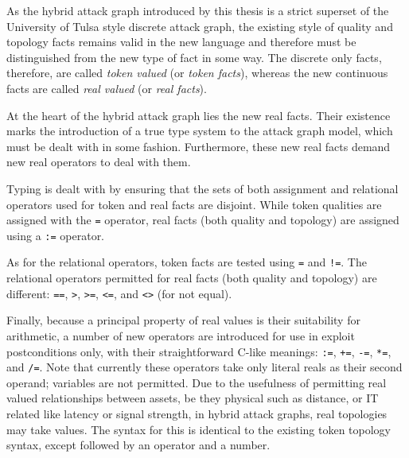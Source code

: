 As the hybrid attack graph introduced by this thesis is a strict superset
of the University of Tulsa style discrete attack graph, the existing style
of quality and topology facts remains valid in the new language and therefore
must be distinguished from the new type of fact in some way. The discrete
only facts, therefore, are called \emph{token valued} (or \emph{token facts}),
whereas the new continuous facts are called \emph{real valued} (or \emph{real
facts}).

At the heart of the hybrid attack graph lies the new real facts. Their
existence marks the introduction of a true type system to the attack graph
model, which must be dealt with in some fashion. Furthermore, these new real 
facts demand new real operators to deal with them.

Typing is dealt with by ensuring that the sets of both assignment and relational
operators used for token and real facts are disjoint. While token qualities are
assigned with the \texttt{=} operator, real facts (both quality and topology)
are assigned using a \texttt{:=} operator.

As for the relational operators, token facts are tested using \texttt{=} 
and \texttt{!=}. The relational operators permitted for real facts (both
quality and topology) are different: \texttt{==}, \texttt{>}, \texttt{>=},
\texttt{<=}, and \texttt{<>} (for not equal).

Finally, because a principal property of real values is their suitability for
arithmetic, a number of new operators are introduced for use in exploit
postconditions only, with their straightforward C-like meanings: \texttt{:=},
\texttt{+=}, \texttt{-=}, \texttt{*=}, and \texttt{/=}. Note that currently
these operators take only literal reals as their second operand; variables
are not permitted.
Due to the usefulness of permitting real valued relationships between assets,
be they physical such as distance, or IT related like latency or signal
strength, in hybrid attack graphs, real topologies may take values. The
syntax for this is identical to the existing token topology syntax, except
followed by an operator and a number.

